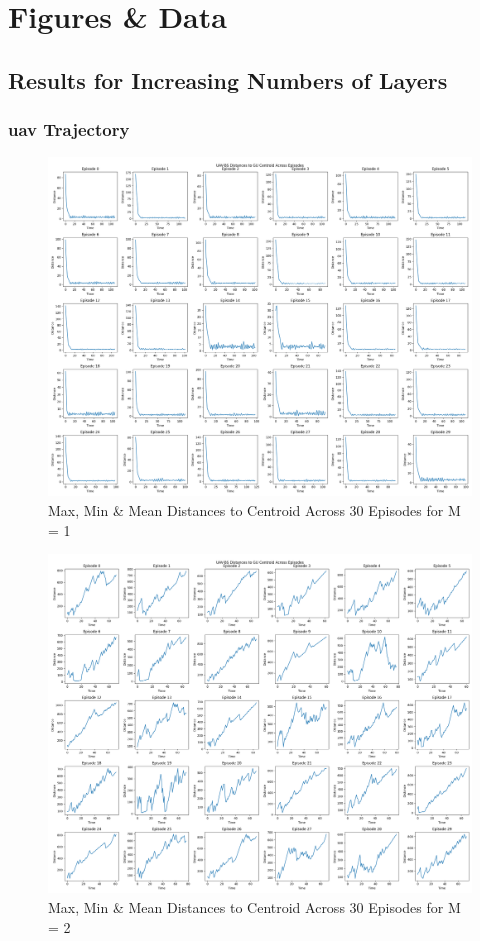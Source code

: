 \chapter{Figures \& Data}
\label{appendix_layers_figures}
\section{Results for Increasing Numbers of Layers}
\subsection{\texorpdfstring{\acrshort{uav}}{UAV} Trajectory}
\begin{figure} [ht!]
    \centering
    \includegraphics[width=0.8\linewidth]{figures/test8_without_trajectory/1_layers_distances_to_centroid.png}
    \caption{Max, Min \& Mean Distances to Centroid Across 30 Episodes for M = 1}
    \label{fig:dist_to_centroid_1_layer_30_ep}
\end{figure}
\begin{figure}
    \centering
    \includegraphics[width=0.8\linewidth]{figures/test8_without_trajectory/2_layers_distances_to_centroid.png}
    \caption{Max, Min \& Mean Distances to Centroid Across 30 Episodes for M = 2}
    \label{fig:dist_to_centroid_2_layers_30_ep}
\end{figure}
